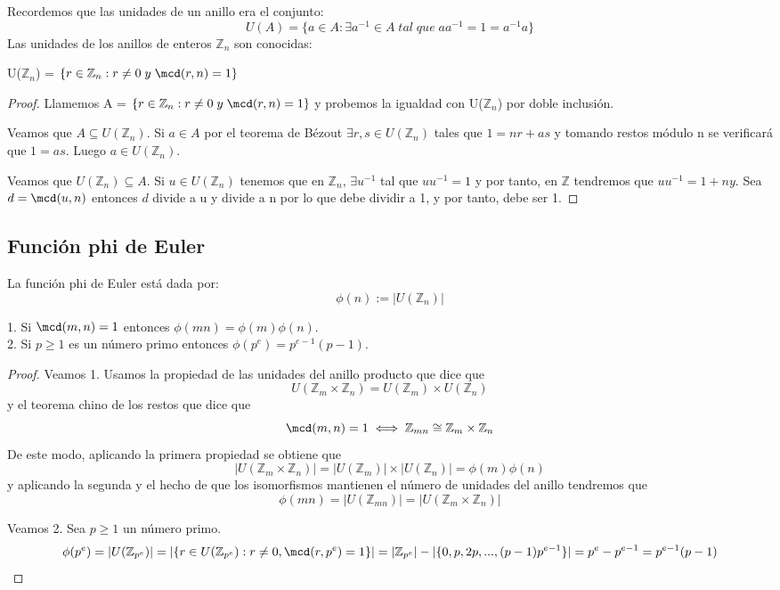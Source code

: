Recordemos que las unidades de un anillo era el conjunto: $$U(A) = \{a \in A : \exists a^{-1} \in A \; tal \; que \; aa^{-1}=1=a^{-1}a\}$$ Las unidades de los anillos de enteros $\mathbb{Z}_n$ son conocidas:

\begin{nprop}
U($\mathbb{Z}_n$) = $\{r \in \mathbb{Z}_n : r \neq 0 \; y \; \mcd(r,n) = 1 \}$
\end{nprop}

\begin{proof}

Llamemos A = $\{r \in \mathbb{Z}_n : r \neq 0 \; y \; \mcd(r,n) = 1 \}$ y probemos la igualdad con U($\mathbb{Z}_n$) por doble inclusión.

Veamos que $A \subseteq U(\mathbb{Z}_n)$. Si $a \in A$ por el teorema de Bézout $\exists r,s \in U(\mathbb{Z}_n)$ tales que $1 = nr+as$ y tomando restos módulo n se verificará que $1 = as$. Luego $a \in U(\mathbb{Z}_n)$.

Veamos que $U(\mathbb{Z}_n) \subseteq A$. Si $u \in U(\mathbb{Z}_n)$ tenemos que en $\mathbb{Z}_n$, $\exists u^{-1}$ tal que $uu^{-1} = 1$ y por tanto, en $\mathbb{Z}$ tendremos que $uu^{-1} = 1 + ny$. Sea $d = \mcd(u,n)$ entonces $d$ divide a u y divide a n por lo que debe dividir a 1, y por tanto, debe ser 1.

\end{proof}

\subsection{Función phi de Euler}

\begin{ndef}
La función phi de Euler está dada por: $$\phi(n) := |U(\mathbb{Z}_n)|$$
\end{ndef}

\begin{nprop}
1. Si $\mcd(m,n) = 1$ entonces $\phi(mn) = \phi(m) \phi(n)$. \\
2. Si $p \ge 1$ es un número primo entonces $\phi(p^{e}) = p^{e-1}(p-1)$.
\end{nprop}

\begin{proof}
Veamos 1. Usamos la propiedad de las unidades del anillo producto que dice que $$U(\mathbb{Z}_m \times \mathbb{Z}_n) = U(\mathbb{Z}_m) \times U(\mathbb{Z}_n)$$ y el teorema chino de los restos que dice que $$\mcd(m,n) = 1 \iff \mathbb{Z}_{mn} \cong \mathbb{Z}_m \times \mathbb{Z}_n$$ De este modo, aplicando la primera propiedad se obtiene que $$|U(\mathbb{Z}_m \times \mathbb{Z}_n)| = |U(\mathbb{Z}_m)| \times |U(\mathbb{Z}_n)| = \phi(m) \phi(n)$$ y aplicando la segunda y el hecho de que los isomorfismos mantienen el número de unidades del anillo tendremos que $$\phi(mn) = |U(\mathbb{Z}_{mn})| = |U(\mathbb{Z}_m \times \mathbb{Z}_n)|$$

Veamos 2. Sea $p \ge 1$ un número primo. $$\phi(p^e) = |U(\mathbb{Z}_{p^e})| = |\{r \in U(\mathbb{Z}_{p^e}) : r \neq 0, \mcd(r,p^e) = 1\}| = |\mathbb{Z}_{p^e}|-|\{0,p,2p,...,(p-1)p^{e-1}\}| = p^e - p^{e-1} = p^{e-1}(p-1)$$
\end{proof}
